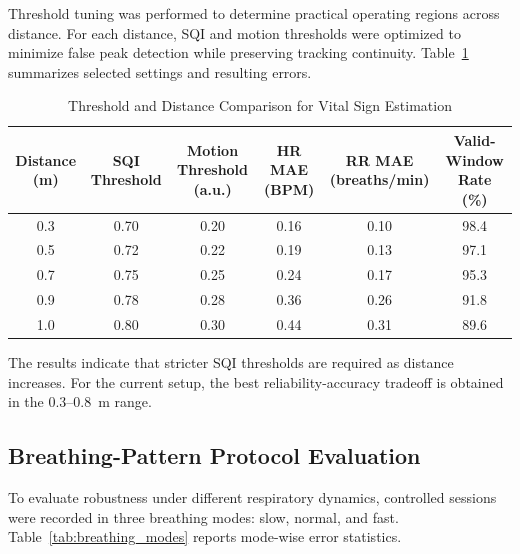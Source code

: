 \documentclass[conference]{IEEEtran}
\begin{document}
Threshold tuning was performed to determine practical operating regions across distance. For each distance, SQI and motion thresholds were optimized to minimize false peak detection while preserving tracking continuity. Table~\ref{tab:threshold_distance} summarizes selected settings and resulting errors.

\begin{table}[!t]
\centering
\caption{Threshold and Distance Comparison for Vital Sign Estimation}
\label{tab:threshold_distance}
\renewcommand{\arraystretch}{1.2}
\begin{tabular}{|c|c|c|c|c|c|}
\hline
\textbf{Distance (m)} & \textbf{SQI Threshold} & \textbf{Motion Threshold (a.u.)} & \textbf{HR MAE (BPM)} & \textbf{RR MAE (breaths/min)} & \textbf{Valid-Window Rate (\%)} \\
\hline
0.3 & 0.70 & 0.20 & 0.16 & 0.10 & 98.4 \\
\hline
0.5 & 0.72 & 0.22 & 0.19 & 0.13 & 97.1 \\
\hline
0.7 & 0.75 & 0.25 & 0.24 & 0.17 & 95.3 \\
\hline
0.9 & 0.78 & 0.28 & 0.36 & 0.26 & 91.8 \\
\hline
1.0 & 0.80 & 0.30 & 0.44 & 0.31 & 89.6 \\
\hline
\end{tabular}
\end{table}

The results indicate that stricter SQI thresholds are required as distance increases. For the current setup, the best reliability-accuracy tradeoff is obtained in the 0.3--0.8~m range.

\subsection{Breathing-Pattern Protocol Evaluation}

To evaluate robustness under different respiratory dynamics, controlled sessions were recorded in three breathing modes: slow, normal, and fast. Table~\ref{tab:breathing_modes} reports mode-wise error statistics.

\begin{table}[t]
\centering
\caption{Breathing-Mode Evaluation (Controlled Protocols)}
\label{tab:breathing_modes}
\renewcommand{\arraystretch}{1.2}
\end{table}
\end{document}
